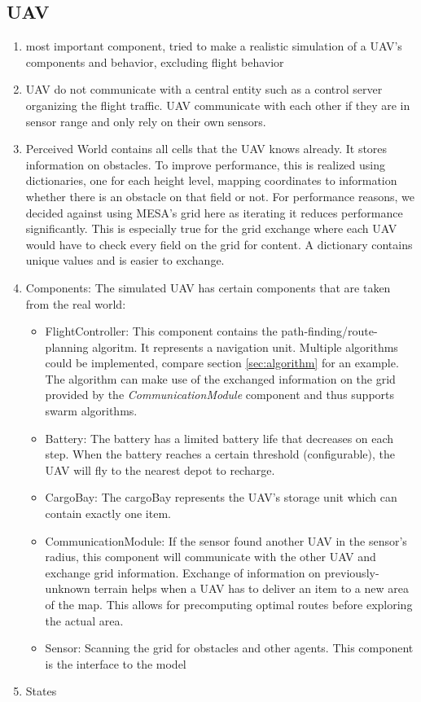 \subsection{UAV}\label{sec:UAV}
\begin{enumerate}
	\item most important component, tried to make a realistic simulation of a UAV's components and behavior, excluding flight behavior
	\item UAV do not communicate with a central entity such as a control server organizing the flight traffic. UAV communicate with each other if they are in sensor range and only rely on their own sensors.
	\item Perceived World contains all cells that the UAV knows already. It stores information on obstacles. To improve performance, this is realized using dictionaries, one for each height level, mapping coordinates to information whether there is an obstacle on that field or not. For performance reasons, we decided against using MESA's grid here as iterating it reduces performance significantly. This is especially true for the grid exchange where each UAV  would have to check every field on the grid for content.  A dictionary contains unique values and is easier to exchange.
	\item Components: The simulated UAV has certain components that are taken from the real world:
	\begin{itemize}
		\item FlightController: This component contains the path-finding/route-planning algoritm. It represents a navigation unit. Multiple algorithms could be implemented, compare section \ref{sec:algorithm} for an example. The algorithm can make use of the exchanged information on the grid provided by the \textit{CommunicationModule} component and thus supports swarm algorithms.
		\item Battery: The battery has a limited battery life that decreases on each step. When the battery reaches a certain threshold (configurable), the UAV will fly to the nearest depot to recharge.
		\item CargoBay: The cargoBay represents the UAV's storage unit which can contain exactly one item.
		\item CommunicationModule: If the sensor found another UAV in the sensor's radius, this component will communicate with the other UAV and exchange grid information. Exchange of information on previously-unknown terrain helps when a UAV has to deliver an item to a new area of the map. This allows for precomputing optimal routes before exploring the actual area.
		\item Sensor: Scanning the grid for obstacles and other agents. This component is the interface to the model
	\end{itemize}
	\item States

\end{enumerate}


